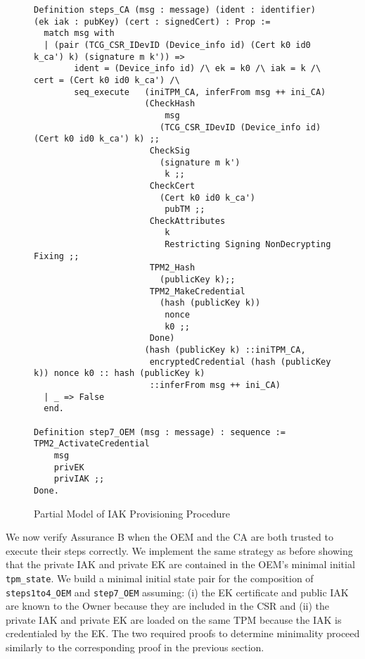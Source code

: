 \documentclass[runningheads]{llncs}
\begin{document}
\begin{figure}[hbtp]
\begin{lstlisting}[language=Coq]
Definition steps_CA (msg : message) (ident : identifier) (ek iak : pubKey) (cert : signedCert) : Prop :=
  match msg with
  | (pair (TCG_CSR_IDevID (Device_info id) (Cert k0 id0 k_ca') k) (signature m k')) =>
        ident = (Device_info id) /\ ek = k0 /\ iak = k /\ cert = (Cert k0 id0 k_ca') /\
        seq_execute   (iniTPM_CA, inferFrom msg ++ ini_CA)
                      (CheckHash 
                          msg 
                         (TCG_CSR_IDevID (Device_info id) (Cert k0 id0 k_ca') k) ;;
                       CheckSig 
                         (signature m k') 
                          k ;;
                       CheckCert 
                         (Cert k0 id0 k_ca') 
                          pubTM ;;
                       CheckAttributes 
                          k 
                          Restricting Signing NonDecrypting Fixing ;;
                       TPM2_Hash 
                         (publicKey k);;
                       TPM2_MakeCredential 
                         (hash (publicKey k))
                          nonce
                          k0 ;;
                       Done)
                      (hash (publicKey k) ::iniTPM_CA, 
                       encryptedCredential (hash (publicKey k)) nonce k0 :: hash (publicKey k) 
                       ::inferFrom msg ++ ini_CA)
  | _ => False
  end.

Definition step7_OEM (msg : message) : sequence :=
TPM2_ActivateCredential 
    msg 
    privEK 
    privIAK ;;
Done.
\end{lstlisting}
\caption{Partial Model of IAK Provisioning Procedure}
\label{fig:iak_model}
\end{figure}

We now verify Assurance B when the OEM and the CA are both trusted to
execute their steps correctly. We implement the same strategy as
before showing that the private IAK and private EK are contained in
the OEM's minimal initial \verb|tpm_state|. We build a minimal initial
state pair for the composition of \verb|steps1to4_OEM| and
\verb|step7_OEM| assuming: (i) the EK certificate and public IAK are
known to the Owner because they are included in the CSR and (ii) the
private IAK and private EK are loaded on the same TPM because the IAK
is credentialed by the EK. The two required proofs to determine
minimality proceed similarly to the corresponding proof in the
previous section.
\end{document}
